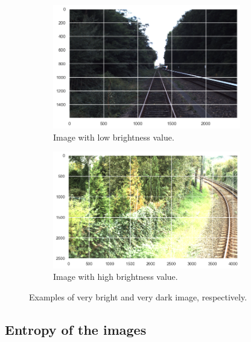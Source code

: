 \documentclass[Master,MDS,english]{BASE/twbook} %
\begin{document}
\begin{figure}
\centering
\begin{subfigure}[t]{.5\textwidth}
  \centering
  \includegraphics[width=0.9\textwidth]{images/datasets/db/dark}
  \caption{Image with low brightness value.}
\end{subfigure}%
\begin{subfigure}[t]{.5\textwidth}
  \centering
  \includegraphics[width=0.9\textwidth]{images/datasets/db/bright}
  \caption{Image with high brightness value.}
\end{subfigure}
\caption{Examples of very bright and very dark image, respectively.}
\label{fig:brightness_examples}
\end{figure}



\subsection{Entropy of the images} \label{sec:entropy}
\end{document}
